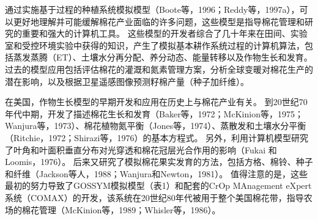 通过实施基于过程的种植系统模拟模型（Boote等，1996；Reddy等，1997a），可以更好地理解并可能缓解棉花产业面临的许多问题，这些模型是指导棉花管理和研究的重要和强大的计算机工具。
这些模型的开发者综合了几十年来在田间、实验室和受控环境实验中获得的知识，产生了模拟基本耕作系统过程的计算机算法，包括蒸发蒸腾（ET）、土壤水分再分配、养分动态、能量转移以及作物生长和发育。
过去的模型应用包括评估棉花的灌溉和氮素管理方案，分析全球变暖对棉花生产的潜在影响，以及根据卫星遥感图像预测籽棉产量（种子加纤维）。

在美国，作物生长模型的早期开发和应用在历史上与棉花产业有关。%
到20世纪70年代中期，开发了描述棉花生长和发育（Baker等，1972；McKinion等，1975；Wanjura等，1973）、棉花植物氮平衡（Jones等，1974）、蒸散发和土壤水分平衡（Ritchie，1972；Shirazi等，1976）的基本方程式。%
另外，利用计算机模型研究了叶角和叶面积垂直分布对光穿透和棉花冠层光合作用的影响（Fukai 和 Loomis，1976）。%
后来又研究了模拟棉花果实发育的方法，包括方格、棉铃、种子和纤维（Jackson等人，1988；Wanjura和Newton，1981）。%
值得注意的是，这些最初的努力导致了GOSSYM模拟模型（表1）和配套的CrOp MAnagement eXpert系统（COMAX）的开发，该系统在20世纪80年代被用于整个美国棉花带，指导农场的棉花管理（McKinion等，1989；Whisler等，1986）。%

